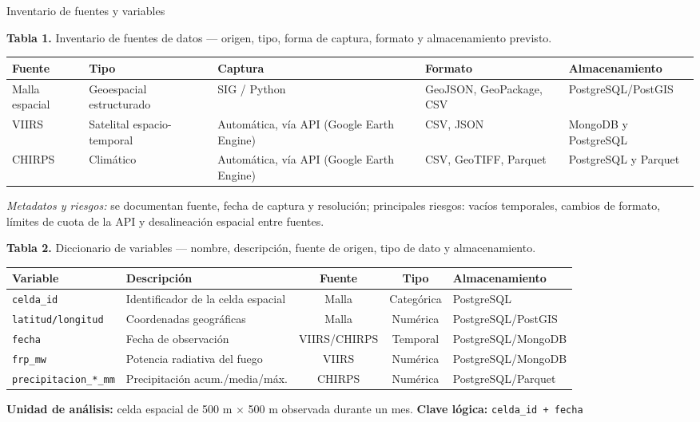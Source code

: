 \documentclass[10pt,aspectratio=169]{beamer}
\begin{document}
\begin{frame}{Inventario de fuentes y variables}

\footnotesize
\textbf{Tabla 1.} Inventario de fuentes de datos --- origen, tipo, forma de captura, formato y almacenamiento previsto.

\scriptsize
\begin{tabularx}{\textwidth}{@{}lXXXX@{}}
\toprule
\textbf{Fuente} & \textbf{Tipo} & \textbf{Captura} & \textbf{Formato} & \textbf{Almacenamiento} \\
\midrule
Malla espacial & Geoespacial estructurado & SIG / Python & GeoJSON, GeoPackage, CSV & PostgreSQL/PostGIS \\
VIIRS & Satelital espacio-temporal & Automática, vía API (Google Earth Engine) & CSV, JSON & MongoDB y PostgreSQL \\
CHIRPS & Climático & Automática, vía API (Google Earth Engine) & CSV, GeoTIFF, Parquet & PostgreSQL y Parquet \\
\bottomrule
\end{tabularx}

\vspace{0.15cm}
\tiny
\textit{Metadatos y riesgos:} se documentan fuente, fecha de captura y resolución; principales riesgos: vacíos temporales, cambios de formato, límites de cuota de la API y desalineación espacial entre fuentes.

\vspace{0.25cm}
\footnotesize
\textbf{Tabla 2.} Diccionario de variables --- nombre, descripción, fuente de origen, tipo de dato y almacenamiento.

\scriptsize
\begin{tabularx}{\textwidth}{@{}lXccX@{}}
\toprule
\textbf{Variable} & \textbf{Descripción} & \textbf{Fuente} & \textbf{Tipo} & \textbf{Almacenamiento} \\
\midrule
\texttt{celda\_id} & Identificador de la celda espacial & Malla & Categórica & PostgreSQL \\
\texttt{latitud/longitud} & Coordenadas geográficas & Malla & Numérica & PostgreSQL/PostGIS \\
\texttt{fecha} & Fecha de observación & VIIRS/CHIRPS & Temporal & PostgreSQL/MongoDB \\
\texttt{frp\_mw} & Potencia radiativa del fuego & VIIRS & Numérica & PostgreSQL/MongoDB \\
\texttt{precipitacion\_*\_mm} & Precipitación acum./media/máx. & CHIRPS & Numérica & PostgreSQL/Parquet \\
\bottomrule
\end{tabularx}

\vspace{0.15cm}
\tiny
\textbf{Unidad de análisis:} celda espacial de 500 m $\times$ 500 m observada durante un mes. \quad
\textbf{Clave lógica:} \texttt{celda\_id + fecha}

\end{frame}
\end{document}
